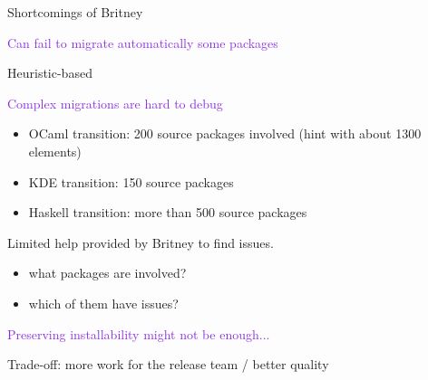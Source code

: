 \documentclass[xcolor={dvipsnames}]{beamer}
\newcommand{\EEE}[1]{\textcolor{BlueViolet}{#1}}
\begin{document}
\begin{frame}[fragile]{Shortcomings of Britney}

\EEE{Can fail to migrate automatically some packages}

Heuristic-based

\vspace{1.5em}

\EEE{Complex migrations are hard to debug}

\begin{itemize}
\item OCaml transition:
200 source packages involved (hint with about 1300 elements)
\item KDE transition: 150 source packages
\item Haskell transition: more than 500 source packages
\end{itemize}
Limited help provided by Britney to find issues.
\begin{itemize}
\item what packages are involved?
\item which of them have issues?
\end{itemize}

\vspace{1.5em}

\EEE{Preserving installability might not be enough...}

Trade-off: more work for the release team / better quality

\end{frame}
\end{document}
